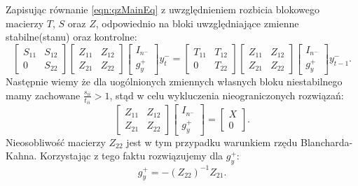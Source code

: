 Zapisując równanie \eqref{eqn:qzMainEq} z uwzględnieniem rozbicia blokowego macierzy $T$, $S$ oraz $Z$, odpowiednio na bloki uwzględniające zmienne stabilne(stanu) oraz kontrolne:
\begin{equation}
    \label{eqn:qzMainBlockEq}
    \begin{bmatrix}
    S_{11} & S_{12} \\
    0 & S_{22}
    \end{bmatrix}
    \begin{bmatrix}
    Z_{11} & Z_{12} \\
    Z_{21} & Z_{22}
    \end{bmatrix}
    \begin{bmatrix}
        I_{n^-} \\
        g_y^+
    \end{bmatrix}  y_t^- = \begin{bmatrix}
    T_{11} & T_{12} \\
    0 & T_{22}
    \end{bmatrix} 
    \begin{bmatrix}
    Z_{11} & Z_{12} \\
    Z_{21} & Z_{22}
    \end{bmatrix}
    \begin{bmatrix}
        I_{n^-} \\
        g_y^+
    \end{bmatrix} y^-_{t-1}.
\end{equation}
Następnie wiemy że dla uogólnionych zmiennych własnych bloku niestabilnego mamy zachowane $\frac{s_{ii}}{t_{ii}} > 1$, stąd w celu wykluczenia nieograniczonych rozwiązań:
\begin{equation}
    \label{eqn:qzNoExplosiveTraj}
    \begin{bmatrix}
    Z_{11} & Z_{12} \\
    Z_{21} & Z_{22}
    \end{bmatrix}
    \begin{bmatrix}
        I_{n^-} \\
        g_y^+
    \end{bmatrix} = \begin{bmatrix}
        X \\
        0
    \end{bmatrix}.
\end{equation}
Nieosobliwość macierzy $Z_{22}$ jest w tym przypadku warunkiem rzędu Blancharda-Kahna. Korzystając z tego faktu rozwiązujemy dla $g_y^+$:
\begin{equation}
    \label{eq:bk_general_solve_plus}
    g_y^+ = - (Z_{22})^{-1} Z_{21}.
\end{equation}
